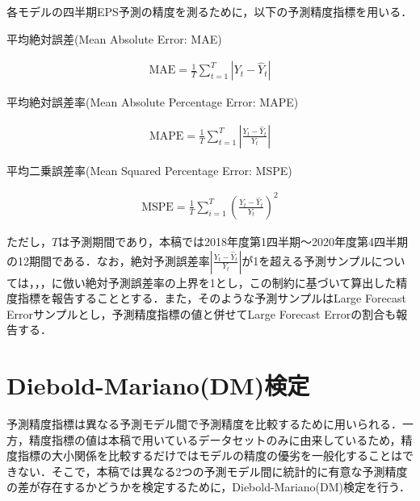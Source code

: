 \documentclass[a4paper，12pt]{jsarticle}
\begin{document}
各モデルの四半期EPS予測の精度を測るために，以下の予測精度指標を用いる．

平均絶対誤差(Mean Absolute Error: MAE)

\begin{equation}
  \begin{split}
    \text{MAE} = \frac {1} {T} \sum^{T}_{t=1}\left| Y_t - \hat{Y}_t \right|
  \end{split}
\end{equation}

平均絶対誤差率(Mean Absolute Percentage Error: MAPE)

\begin{equation}
  \begin{split}
    \text{MAPE} = \frac {1} {T} \sum^{T}_{t=1}\left| \frac {Y_t - \hat{Y}_t} {Y_t} \right|
  \end{split}
\end{equation}

平均二乗誤差率(Mean Squared Percentage Error: MSPE)

\begin{equation}
  \begin{split}
    \text{MSPE} = \frac {1} {T} \sum^{T}_{i=1} \left( \frac {Y_t - \hat{Y}_t} {Y_t} \right) ^2
  \end{split}
\end{equation}

ただし，$T$は予測期間であり，本稿では2018年度第1四半期～2020年度第4四半期の12期間である．なお，絶対予測誤差率$ \left| \frac{Y_t -{\hat Y}_t}{Y_t} \right|$が1を超える予測サンプルについては，\cite*{brown1979univariate}，\cite*{lorek1996multivariate}，\cite{zhang2004neural}に倣い絶対予測誤差率の上界を1とし，この制約に基づいて算出した精度指標を報告することとする．また，そのような予測サンプルはLarge Forecast Errorサンプルとし，予測精度指標の値と併せてLarge Forecast Errorの割合も報告する．

\section{Diebold-Mariano(DM)検定}

予測精度指標は異なる予測モデル間で予測精度を比較するために用いられる．一方，精度指標の値は本稿で用いているデータセットのみに由来しているため，精度指標の大小関係を比較するだけではモデルの精度の優劣を一般化することはできない．そこで，本稿では異なる2つの予測モデル間に統計的に有意な予測精度の差が存在するかどうかを検定するために，Diebold-Mariano(DM)検定\citep*{diebold2002comparing}を行う．
\end{document}
